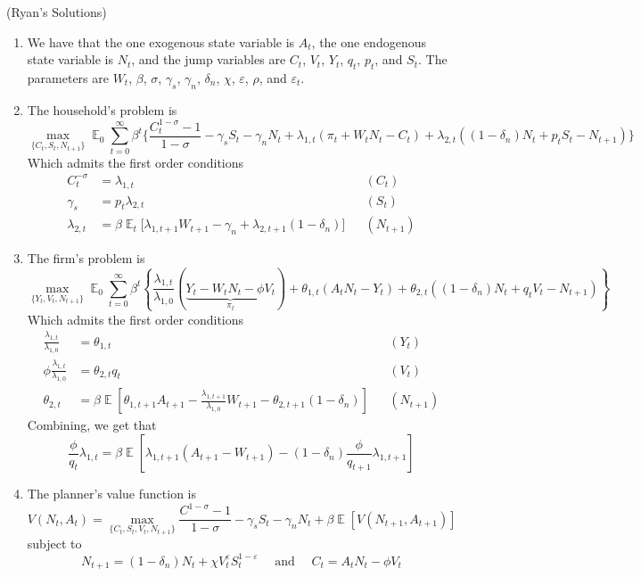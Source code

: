 \documentclass[10pt]{article}
\newcommand{\expect}{\mathop{\mathbb{E}}} %
\newcommand{\parl}{\left(}
\newcommand{\parr}{\right)}
\newcommand{\barl}{\left[}
\newcommand{\barr}{\right]}
\newcommand{\curll}{\left\{}
\newcommand{\curlr}{\right\}}
\theoremstyle{plain}
\theoremstyle{definition}
\begin{document}
(Ryan's Solutions)

\begin{enumerate}
	\item We have that the one exogenous state variable is $A_t$, the one endogenous state variable is $N_t$, and the jump variables are $C_t$, $V_t$, $Y_t$, $q_t$, $p_t$, and $S_t$. The parameters are $W_t$, $\beta$, $\sigma$, $\gamma_s$, $\gamma_n$, $\delta_n$, $\chi$, $\varepsilon$, $\rho$, and $\varepsilon_t$.
	\item The household's problem is
	\[
	\max_{\{C_t,S_t,N_{t+1}\}} \expect_0 \sum_{t=0}^\infty \beta^t \Bigg\{ \frac{C_t^{1-\sigma} - 1}{1-\sigma} - \gamma_s S_t - \gamma_n N_t + \lambda_{1,t}\parl \pi_t + W_tN_t - C_t\parr + \lambda_{2,t}\parl (1-\delta_n) N_t + p_tS_t - N_{t+1}\parr\Bigg\}
	\]
	Which admits the first order conditions
	\begin{align*}
		C_t^{-\sigma} &= \lambda_{1,t} &&(C_t) \\
		\gamma_s &= p_t\lambda_{2,t} &&(S_t) \\
		\lambda_{2,t} &= \beta \expect_{t}\Big[ \lambda_{1,t+1} W_{t+1} - \gamma_n + \lambda_{2,t+1}(1-\delta_n)  \Big] &&(N_{t+1})
	\end{align*}
	\item The firm's problem is 
	\[
	\max_{\{Y_t,V_t,N_{t+1}\}} \expect_0 \sum_{t=0}^\infty \beta^t \curll \frac{\lambda_{1,t}}{\lambda_{1,0}} (\underbrace{Y_t - W_tN_t - \phi V_t}_{\pi_t}) + \theta_{1,t}(A_tN_t - Y_t) + \theta_{2,t} ((1-\delta_n)N_t + q_tV_t - N_{t+1})\curlr 
	\]
	Which admits the first order conditions
	\begin{align*}
		\frac{\lambda_{1,t}}{\lambda_{1,0}} &= \theta_{1,t} &&(Y_t) \\
		\phi \frac{\lambda_{1,t}}{\lambda_{1,0}} &= \theta_{2,t}q_t &&(V_t) \\
		\theta_{2,t} &= \beta \expect \barl \theta_{1,t+1} A_{t+1} - \frac{\lambda_{1,t+1}}{\lambda_{1,0}}W_{t+1} - \theta_{2,t+1}(1-\delta_n)\barr &&(N_{t+1}) 
	\end{align*}
	Combining, we get that
	\[
	\frac{\phi}{q_t}\lambda_{1,t} = \beta \expect \barl \lambda_{1,t+1}(A_{t+1}-W_{t+1}) - (1-\delta_n) \frac{\phi}{q_{t+1}}\lambda_{1,t+1} \barr
	\]
	\item The planner's value function is
	\[
	V(N_t,A_t) = \max_{\{C_t,S_t,V_t,N_{t+1}\}} \frac{C^{1-\sigma}-1}{1-\sigma} - \gamma_sS_t - \gamma_n N_t + \beta \expect \barl V(N_{t+1},A_{t+1})\barr
	\]
	subject to
	\[
	N_{t+1} = (1-\delta_n)N_t + \chi V_t^\varepsilon S_t^{1-\varepsilon} \quad \text{ and } \quad C_t = A_tN_t - \phi V_t
\]
\end{enumerate}
\end{document}
